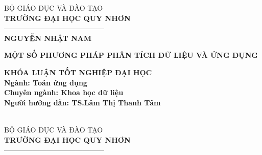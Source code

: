\documentclass[12pt,a4paper,oneside]{report}
\numberwithin{equation}{section}
\begin{document}
\thispagestyle{empty}
\thisfancypage{\setlength{\fboxsep}{2pt}\setlength{\fboxrule}{2pt}\doublebox}{} 
\begin{center} %
{\fontsize{14pt}{16}\selectfont BỘ GIÁO DỤC VÀ ĐÀO TẠO}\\
\vskip 0.05cm
{\bf\fontsize{14pt}{16}\selectfont TRƯỜNG ĐẠI HỌC QUY NHƠN}\\
{——————————————}\\
\vskip 2cm
{\bf\fontsize{16pt}{22}\selectfont NGUYỄN NHẬT NAM}
\vskip 3cm
\begin{center}
{\bf\fontsize{22pt}{22}\selectfont MỘT SỐ PHƯƠNG PHÁP PHÂN TÍCH DỮ LIỆU VÀ ỨNG DỤNG}

\end{center}

\vskip 2.5cm
{\bf\fontsize{16pt}{22}\selectfont KHÓA LUẬN TỐT NGHIỆP ĐẠI HỌC}\\
\vskip 0.5cm
{\bf\fontsize{16pt}{22}\selectfont Ngành: Toán ứng dụng }\\
\vskip 0.05cm
{\bf\fontsize{16pt}{22}\selectfont Chuyên ngành: Khoa học dữ liệu}\\
\vskip 2.5cm
{\bf\fontsize{16pt}{22}\selectfont Người hướng dẫn: TS.Lâm Thị Thanh Tâm}\\

\vfill
{\bf\fontsize{14pt}{16}\selectfont {Bình Định, 2023}}\\
\end{center}
\newpage
\thispagestyle{empty}


\thisfancypage{\setlength{\fboxsep}{2pt}\setlength{\fboxrule}{2pt}\doublebox}{} 
\begin{center} %
{\fontsize{14pt}{16}\selectfont BỘ GIÁO DỤC VÀ ĐÀO TẠO}\\
\vskip 0.05cm
{\bf\fontsize{14pt}{16}\selectfont TRƯỜNG ĐẠI HỌC QUY NHƠN}\\
{——————————————}\\
\end{center}
\end{document}
